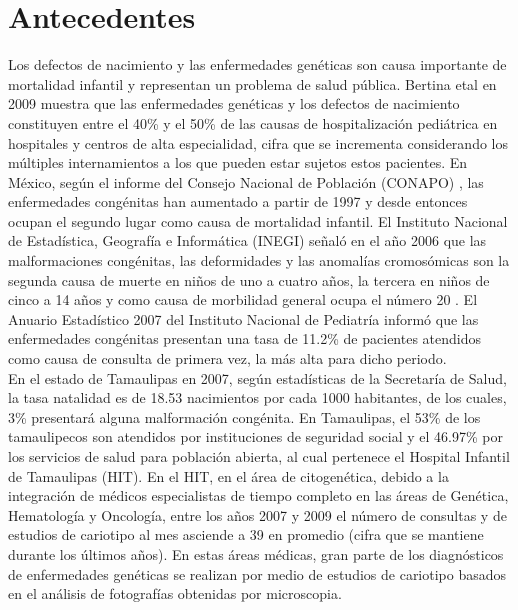 \documentclass[12pt,letterpaper,titlepage]{article}
\begin{document}
\section{Antecedentes}\label{antecedentes}
Los defectos de nacimiento y las enfermedades genéticas son causa importante de mortalidad infantil y representan un problema de salud pública. Bertina etal  en 2009 \cite{102} muestra que las enfermedades genéticas y los defectos de nacimiento constituyen entre el 40\% y el 50\% de las causas de hospitalización pediátrica en hospitales y centros de alta especialidad, cifra que se incrementa considerando los múltiples internamientos a los que pueden estar sujetos estos pacientes. En México, según el informe del Consejo Nacional de Población (CONAPO) \cite{101}, las enfermedades congénitas han aumentado a partir de 1997 y desde entonces ocupan el segundo lugar como causa de mortalidad infantil. El Instituto Nacional de Estadística, Geografía e Informática (INEGI) señaló en el año 2006 que las malformaciones congénitas, las deformidades y las anomalías cromosómicas son la segunda causa de muerte en niños de uno a cuatro años, la tercera en niños de cinco a 14 años y como causa de morbilidad general ocupa el número 20 \cite{102}. El Anuario Estadístico 2007 del Instituto Nacional de Pediatría informó que las enfermedades congénitas presentan una tasa de 11.2\% de pacientes atendidos como causa de consulta de primera vez, la más alta para dicho periodo. \\

En el estado de Tamaulipas en 2007, según estadísticas de la Secretaría de Salud, la tasa natalidad es de 18.53 nacimientos por cada 1000 habitantes, de los cuales, 3\% presentará alguna malformación congénita. En Tamaulipas, el 53\% de los tamaulipecos son atendidos por instituciones de seguridad social y el 46.97\% por los servicios de salud para población abierta, al cual pertenece el Hospital Infantil de Tamaulipas (HIT). En el HIT, en el área de citogenética, debido a la integración de médicos especialistas de tiempo completo en las áreas de Genética, Hematología y Oncología, entre los años 2007 y 2009 el número de consultas y de estudios de cariotipo al mes asciende a 39 en promedio (cifra que se mantiene durante los últimos años). En estas áreas médicas, gran parte de los diagnósticos de enfermedades genéticas se realizan por medio de estudios de cariotipo basados en el análisis de fotografías obtenidas por microscopia. \\
\end{document}
